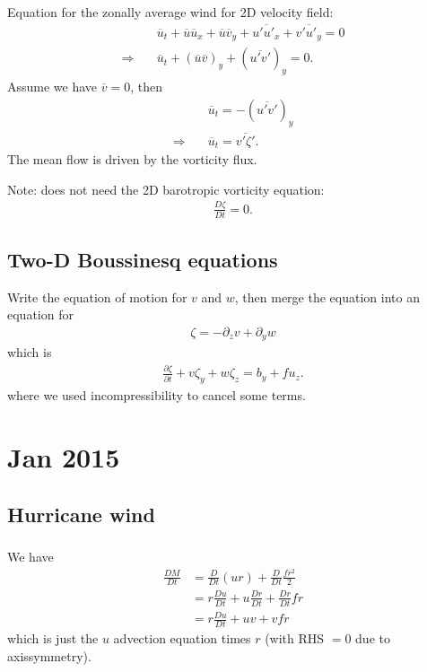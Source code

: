 \documentclass[11pt,letterpaper]{book}
\theoremstyle{definition}
\newcommand{\pe}{\partial}
\newcommand{\thus}{\Rightarrow \quad }
\begin{document}
Equation for the zonally average wind for 2D velocity field:
\begin{align*}
&\overline{u}_t + \overline{u}\overline{u}_x + \overline{u}\overline{v}_y+\overline{u'u'_x}+\overline{v'u'_y} = 0\\
\thus &\overline{u}_t + (\overline{u}\overline{v})_y+(\overline{u'v'})_y = 0.
\end{align*}
Assume we have $\overline{v}=0$, then
\begin{align*}
&\overline{u}_t = -(\overline{u'v'})_y\\
\thus &\overline{u}_t = \overline{v'\zeta'}.
\end{align*}
The mean flow is driven by the vorticity flux.

Note: does not need the 2D barotropic vorticity equation:
\begin{align*}
    \frac{D\zeta}{Dt} = 0.
\end{align*}

\section{Two-D Boussinesq equations}
Write the equation of motion for $v$ and $w$, then merge the equation into an equation for
\begin{align*}
    \zeta = -\pe_z v+\pe_y w
\end{align*}
which is
\begin{align*}
    \frac{\pe\zeta}{\pe t}+v\zeta_y+w\zeta_z = b_y+fu_z.
\end{align*}
where we used incompressibility to cancel some terms.


\chapter{Jan 2015}
\section{Hurricane wind}\label{prob:jan_2015_1}
\subsection{}\label{prob:jan_2015_1_1}
We have
\begin{align*}
    \frac{D M}{D t} &= \frac{D}{D t}(ur)+\frac{D}{D t}\frac{fr^2}{2}\\
    &= r\frac{D u}{D t}+u\frac{D r}{D t}+\frac{D r}{D t}fr\\
    &= r\frac{D u}{D t}+uv+vfr
\end{align*}
which is just the $u$ advection equation times $r$ (with RHS $= 0$ due to axissymmetry). 
\end{document}
